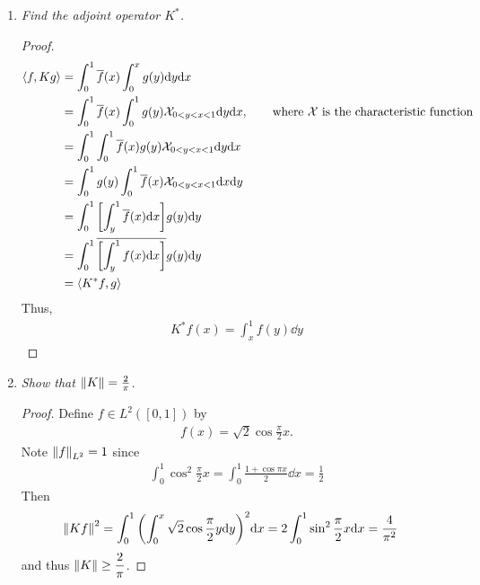 \documentclass{article} %
\theoremstyle{plain}
\newcommand{\VEC}[2]{\left\langle #1, #2 \right\rangle}
\numberwithin{equation}{section} %
\numberwithin{figure}{section} %
\numberwithin{table}{section} %
\begin{document}
\begin{enumerate}[\it a)]
    \item
        \emph{Find the adjoint operator $K^*$.}
        \begin{proof}
            \begin{align*}
                \VEC{f}{Kg} &= \int_0^1 \overline{f}(x)\int_0^x g(y)\dd y \dd x \\
                &= \int_0^1 \overline{f}(x)\int_0^1 g(y)\mathcal{X}_{0 < y < x < 1}\dd y \dd x, \qquad \text{where $\mathcal{X}$ is the characteristic function} \\
                &= \int_0^1 \int_0^1 \overline{f}(x)g(y)\mathcal{X}_{0<y<x<1}\dd y \dd x \\
                &= \int_0^1 g(y) \int_0^1 \overline{f}(x)\mathcal{X}_{0<y<x<1}\dd x \dd y \\
                &= \int_0^1 \qty[\int_y^1 \overline{f}(x)\dd x]g(y) \dd y \\
                &= \int_0^1 \overline{\qty[\int_y^1 f(x)\dd x]}g(y) \dd y \\
                &= \VEC{K^* f}{g}
            \end{align*}
            Thus,
            \begin{align*}
                K^*f(x) = \int_x^1 f(y)\dd y
            \end{align*}
        \end{proof}
    \item
        \emph{Show that $\norm{K} = \frac{2}{\pi}$.}
        \begin{proof}
            Define $f \in L^2([0,1])$ by
            \begin{align*}
                f(x) = \sqrt{2}\cos\frac{\pi}{2}x.
            \end{align*}
            Note $\norm{f}_{L^2} = 1$ since
            \begin{align*}
                \int_0^1 \cos^2\frac{\pi}{2}x = \int_0^1 \frac{1 + \cos \pi x}{2}\dd x = \frac{1}{2}
            \end{align*}
            Then
            \begin{align*}
                \norm{Kf}^2 &= \int_0^1\qty(\int_0^x \sqrt{2}\cos\frac{\pi}{2}y \dd y)^2 \dd x = 2\int_0^1\sin^2\frac{\pi}{2}x\dd x = \frac{4}{\pi^2}
            \end{align*}
            and thus $\norm{K} \geq \dfrac{2}{\pi}$.  
            

\end{proof}
\end{enumerate}
\end{document}

